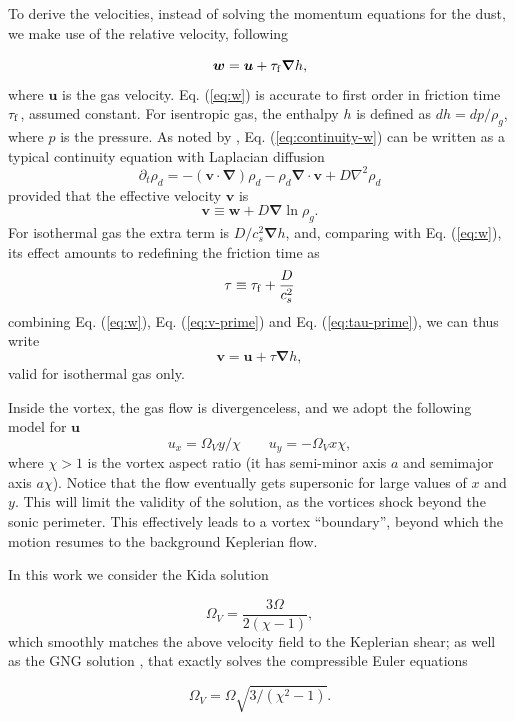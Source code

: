 \documentclass[apj]{emulateapj}
\renewcommand{\v}[1]{{\boldsymbol{#1}}} %
\newcommand{\del}{\v{\nabla}}
\newcommand{\grad}{\del}
\newcommand{\Div}{\del\cdot}
\newcommand{\Laplace}{\nabla^2}
\newcommand{\Eq}[1]{Eq. (\ref{#1})}
\newcommand{\eq}[1]{\Eq{#1}}
\newcommand{\beq}{\begin{equation}}
\newcommand{\eeq}{\end{equation}}
\newcommand{\tauf}{\tau_{\rm f}}
\begin{document}
To derive the velocities, instead of solving the momentum equations
for the dust, we make use of the relative velocity, following
\citet[see also \citealt{Youdin08}]{Youdin-Goodman05}

\beq
\v{w} = \v{u} + \tauf  \grad{h}, 
\label{eq:w}
\eeq
\noindent where $\v{u}$ is the gas velocity. \eq{eq:w} is 
accurate to first order in friction time $\tauf$, assumed 
constant. For isentropic gas, the enthalpy $h$ is defined as $dh = dp /\rho_g$, where $p$ 
is the pressure. As noted by
\cite{Charnoz11}, \eq{eq:continuity-w} can be written as a typical continuity equation with Laplacian diffusion 
\beq
\partial_t \rho_d = -(\v{v} \cdot\del)\rho_d - \rho_d \Div{\v{v}} + D\Laplace\rho_d \label{eq:continuity}
\eeq
\noindent provided that the effective velocity $\v{v}$ is 
\beq
\v{v} \equiv \v{w}  + D\grad\ln \rho_g\label{eq:v-prime}.
\eeq\noindent For isothermal gas the extra term is $D/c_s^2 \grad{h}$,
and, comparing with \eq{eq:w}, its effect amounts to redefining the
friction time as 
\beq
\tau \equiv \tauf + \frac{D}{c_s^2}\label{eq:tau-prime}
\eeq
\noindent combining \eq{eq:w}, \eq{eq:v-prime} and \eq{eq:tau-prime},
we can thus write
\beq
\v{v} = \v{u} + \tau \grad{h}, \label{eq:v}
\eeq \noindent valid for isothermal gas only.

Inside the vortex, the gas flow is divergenceless, and 
we adopt the following model for $\v{u}$
\beq
  u_x = \varOmega_V y / \chi \qquad  u_y= -\varOmega_V x \chi,
  \label{eq:vortex}
\eeq
\noindent where $\chi > 1$ is the vortex aspect ratio (it has
semi-minor axis $a$ and semimajor axis $a\chi$). Notice that the flow eventually
  gets supersonic for large values of $x$ and $y$. This will limit the
  validity of the solution, as the vortices shock beyond the sonic
  perimeter. This effectively leads to a vortex ``boundary'', beyond
  which the motion resumes to the background Keplerian flow.

In this work we consider the Kida solution \citep{Kida81}

\beq
\varOmega_V = \frac{3\varOmega}{2(\chi-1)},  
\eeq
which smoothly matches the above velocity field to the Keplerian
shear; as well as the GNG solution \citep{Goodman87}, that exactly solves the 
compressible Euler equations 

\beq
\varOmega_V=\varOmega\sqrt{3/(\chi^2-1)}.
\eeq
\end{document}
